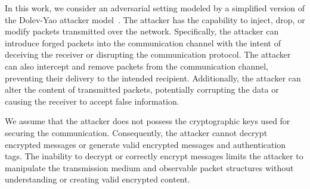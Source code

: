 In this work, we consider an adversarial setting modeled by a simplified version of the Dolev-Yao attacker model~\cite{Dolev-Yao}. The attacker has the capability to inject, drop, or modify packets transmitted over the network. Specifically, the attacker can introduce forged packets into the communication channel with the intent of deceiving the receiver or disrupting the communication protocol. The attacker can also intercept and remove packets from the communication channel, preventing their delivery to the intended recipient. Additionally, the attacker can alter the content of transmitted packets, potentially corrupting the data or causing the receiver to accept false information.

We assume that the attacker does not possess the cryptographic keys used for securing the communication. Consequently, the attacker cannot decrypt encrypted messages or generate valid encrypted messages and authentication tags. The inability to decrypt or correctly encrypt messages limits the attacker to manipulate the transmission medium and observable packet structures without understanding or creating valid encrypted content.


